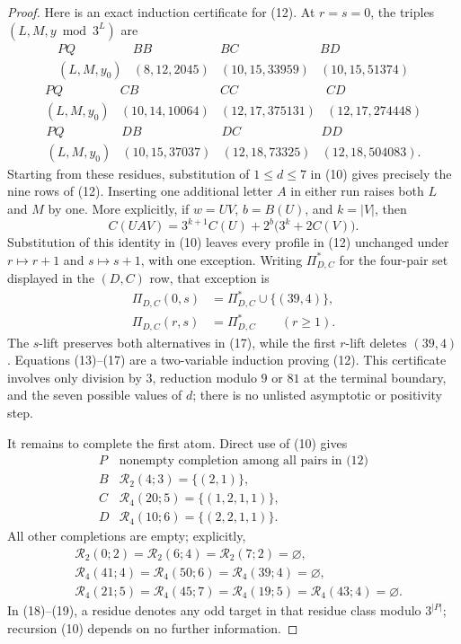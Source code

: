 \documentclass[11pt]{article}
\begin{document}
\begin{proof}
Here is an exact induction certificate for (12).  At $r=s=0$, the
triples $(L,M,y\bmod3^L)$ are
\[
\begin{array}{c|ccc}
PQ&BB&BC&BD\\ \hline
(L,M,y_0)&(8,12,2045)&(10,15,33959)&(10,15,51374)
\end{array}
\tag{13}
\]
\[
\begin{array}{c|ccc}
PQ&CB&CC&CD\\ \hline
(L,M,y_0)&(10,14,10064)&(12,17,375131)&(12,17,274448)
\end{array}
\tag{14}
\]
\[
\begin{array}{c|ccc}
PQ&DB&DC&DD\\ \hline
(L,M,y_0)&(10,15,37037)&(12,18,73325)&(12,18,504083).
\end{array}
\tag{15}
\]
Starting from these residues, substitution of $1\leq d\leq7$ in
(10) gives precisely the nine rows of (12).  Inserting one additional
letter $A$ in either run raises both $L$ and $M$ by one.  More
explicitly, if $w=UV$, $b=B(U)$, and $k=|V|$, then
\[
 C(UAV)=3^{k+1}C(U)+2^b\bigl(3^k+2C(V)\bigr).
\tag{16}
\]
Substitution of this identity in (10) leaves every profile in (12)
unchanged under $r\mapsto r+1$ and $s\mapsto s+1$, with one exception.
Writing $\Pi^*_{D,C}$ for the four-pair set displayed in the $(D,C)$
row, that exception is
\[
 \begin{aligned}
 \Pi_{D,C}(0,s)&=\Pi^*_{D,C}\cup\{(39,4)\},\\
 \Pi_{D,C}(r,s)&=\Pi^*_{D,C}\qquad(r\geq1).
 \end{aligned}
 \tag{17}
\]
The $s$-lift preserves both alternatives in (17), while the first
$r$-lift deletes $(39,4)$.  Equations (13)--(17) are a two-variable
induction proving (12).  This
certificate involves only division by $3$, reduction modulo $9$ or
$81$ at the terminal boundary, and the seven possible values of $d$;
there is no unlisted asymptotic or positivity step.

It remains to complete the first atom.  Direct use of (10) gives
\[
\begin{array}{c|c}
P&\text{nonempty completion among all pairs in (12)}\\ \hline
B&\mathcal R_2(4;3)=\{(2,1)\},\\
C&\mathcal R_4(20;5)=\{(1,2,1,1)\},\\
D&\mathcal R_4(10;6)=\{(2,2,1,1)\}.
\end{array}
\tag{18}
\]
All other completions are empty; explicitly,
\[
\begin{aligned}
 &\mathcal R_2(0;2)=\mathcal R_2(6;4)
  =\mathcal R_2(7;2)=\varnothing,\\
 &\mathcal R_4(41;4)=\mathcal R_4(50;6)
  =\mathcal R_4(39;4)=\varnothing,\\
 &\mathcal R_4(21;5)=\mathcal R_4(45;7)
  =\mathcal R_4(19;5)=\mathcal R_4(43;4)=\varnothing.
\end{aligned}
\tag{19}
\]
In (18)--(19), a residue denotes any odd target in that residue class
modulo $3^{|P|}$; recursion (10) depends on no further information.


\end{proof}
\end{document}
